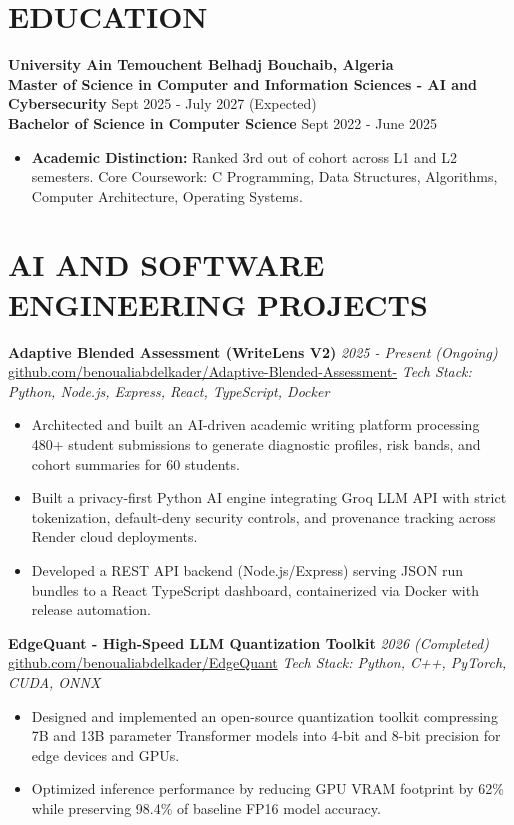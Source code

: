 \documentclass[10pt,letterpaper]{article}
\begin{document}
\section*{EDUCATION}
\textbf{University Ain Temouchent Belhadj Bouchaib, Algeria}\\
\textbf{Master of Science in Computer and Information Sciences - AI and Cybersecurity} \hfill Sept 2025 - July 2027 (Expected)\\
\textbf{Bachelor of Science in Computer Science} \hfill Sept 2022 - June 2025
\begin{itemize}
    \item \textbf{Academic Distinction:} Ranked 3rd out of cohort across L1 and L2 semesters. Core Coursework: C Programming, Data Structures, Algorithms, Computer Architecture, Operating Systems.
\end{itemize}

\section*{AI AND SOFTWARE ENGINEERING PROJECTS}
\textbf{Adaptive Blended Assessment (WriteLens V2)} \hfill \textit{2025 - Present (Ongoing)}\\
\mbox{\href{https://github.com/benoualiabdelkader/Adaptive-Blended-Assessment-}{github.com/benoualiabdelkader/Adaptive-Blended-Assessment-}} \hfill \textit{Tech Stack: Python, Node.js, Express, React, TypeScript, Docker}
\begin{itemize}
    \item Architected and built an AI-driven academic writing platform processing 480+ student submissions to generate diagnostic profiles, risk bands, and cohort summaries for 60 students.
    \item Built a privacy-first Python AI engine integrating Groq LLM API with strict tokenization, default-deny security controls, and provenance tracking across Render cloud deployments.
    \item Developed a REST API backend (Node.js/Express) serving JSON run bundles to a React TypeScript dashboard, containerized via Docker with release automation.
\end{itemize}

\vspace{1pt}
\textbf{EdgeQuant - High-Speed LLM Quantization Toolkit} \hfill \textit{2026 (Completed)}\\
\mbox{\href{https://github.com/benoualiabdelkader/EdgeQuant}{github.com/benoualiabdelkader/EdgeQuant}} \hfill \textit{Tech Stack: Python, C++, PyTorch, CUDA, ONNX}
\begin{itemize}
    \item Designed and implemented an open-source quantization toolkit compressing 7B and 13B parameter Transformer models into 4-bit and 8-bit precision for edge devices and GPUs.
    \item Optimized inference performance by reducing GPU VRAM footprint by 62\% while preserving 98.4\% of baseline FP16 model accuracy.
\end{itemize}
\end{document}
